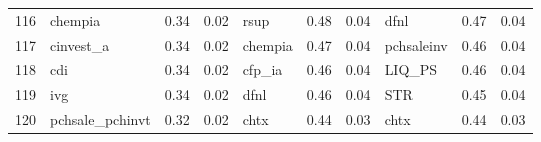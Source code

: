\documentclass[12pt]{article}
\begin{document}
\begin{landscape}
\begin{footnotesize}
\begin{longtable}{l|lcc|lcc|lcc}
			116                   & chempia                     & 0.34                                                                                 & 0.02                            & rsup                        & 0.48                                                                                 & 0.04                            & dfnl                        & 0.47                                                                                 & 0.04                           \\
			117                   & cinvest\_a                  & 0.34                                                                                 & 0.02                            & chempia                     & 0.47                                                                                 & 0.04                            & pchsaleinv                  & 0.46                                                                                 & 0.04                           \\
			118                   & cdi                         & 0.34                                                                                 & 0.02                            & cfp\_ia                     & 0.46                                                                                 & 0.04                            & LIQ\_PS                     & 0.46                                                                                 & 0.04                           \\
			119                   & ivg                         & 0.34                                                                                 & 0.02                            & dfnl                        & 0.46                                                                                 & 0.04                            & STR                         & 0.45                                                                                 & 0.04                           \\
			120                   & pchsale\_pchinvt            & 0.32                                                                                 & 0.02                            & chtx                        & 0.44                                                                                 & 0.03                            & chtx                        & 0.44                                                                                 & 0.03                           \\

\end{longtable}
\end{footnotesize}
\end{landscape}
\end{document}
